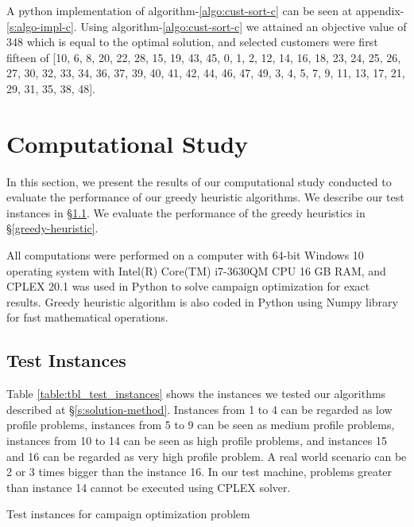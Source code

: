 \documentclass[11pt]{article}
\begin{document}
 A python implementation of algorithm-\ref{algo:cust-sort-c} can be seen at appendix-\ref{s:algo-impl-c}. Using algorithm-\ref{algo:cust-sort-c} we attained an objective value of 348 which is equal to the optimal solution, and selected customers were first fifteen of [10, 6, 8, 20, 22, 28, 15, 19, 43, 45, 0, 1, 2, 12, 14, 16, 18, 23, 24, 25, 26, 27, 30, 32, 33, 34, 36, 37, 39, 40, 41, 42, 44, 46, 47, 49, 3, 4, 5, 7, 9, 11, 13, 17, 21, 29, 31, 35, 38, 48].

\newpage
\section{Computational Study} \label{s:num-analysis}

In this section, we present the results of our computational study conducted to evaluate the performance of our greedy heuristic algorithms. We describe our test instances in \S \ref{test_cases}. We evaluate the performance of the greedy heuristics in \S \ref{greedy-heuristic}.

All computations were performed on a computer with 64-bit Windows 10 operating system with Intel(R) Core(TM) i7-3630QM CPU 16 GB RAM, and CPLEX 20.1 was used in Python to solve campaign optimization for exact results. Greedy heuristic algorithm is also coded in Python using Numpy library for fast mathematical operations.

\subsection{Test Instances} \label{test_cases}
Table \ref{table:tbl_test_instances} shows the instances we tested our algorithms described at \S \ref{s:solution-method}. Instances from 1 to 4 can be regarded as low profile problems, instances from 5 to 9 can be seen as medium profile problems, instances from 10 to 14 can be seen as high profile problems, and instances 15 and 16 can be regarded as very high profile problem. A real world scenario can be 2 or 3 times bigger than the instance 16. In our test machine, problems greater than instance 14 cannot be executed using CPLEX solver.\\
 
\begin{table}[htb]
    \centering
    \caption[Short Caption for LoT]{Test instances for campaign optimization problem}\label{table:tbl_test_instances}
\end{table}
\end{document}
